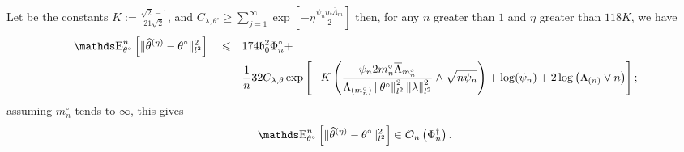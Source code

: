 \begin{thm}\label{THM_FREQ_CIRCDECONV_KNOWN_IID_ORACLE_NP_FAST}
Let be the constants $K := \frac{\sqrt{2} - 1}{21 \sqrt{2}}$, and $C_{\lambda, \theta^{\circ}} \geq \sum\limits_{j = 1}^{\infty} \exp\left[- \eta \frac{\psi_{n} m \overline{\Lambda}_{m}}{2}\right]$ then, for any $n$ greater than $1$ and $\eta$ greater than $118 K$, we have
\begin{alignat*}{3}
& \E_{\theta^{\circ}}^{n}\left[\Vert \widehat{\theta}^{(\eta)} - \theta^{\circ} \Vert_{l^{2}}^{2}\right] && \leq && 174 \mathfrak{b}_{0}^{2} \Phi^{\circ}_{n} + \\
& && && \frac{1}{n} 32 C_{\lambda, \theta} \exp\left[- K\left(\frac{\psi_{n} 2 m^{\circ}_{n} \overline{\Lambda}_{m^{\circ}_{n}}}{\Lambda_{(m^{\circ}_{n})} \left\Vert \theta^{\circ} \right\Vert_{l^{2}}^{2} \left\Vert \lambda \right\Vert_{l^{2}}^{2}}\wedge \sqrt{n \psi_{n}}\right) + \log(\psi_{n}) + 2 \log\left(\Lambda_{(n)} \vee n\right)\right];
\end{alignat*}
assuming $m^{\circ}_{n}$ tends to $\infty$, this gives
\[\E_{\theta^{\circ}}^{n}\left[\Vert \widehat{\theta}^{(\eta)} - \theta^{\circ} \Vert_{l^{2}}^{2}\right] \in \mathcal{O}_{n}\left(\Phi^{\dagger}_{n}\right).\]
\end{thm}
